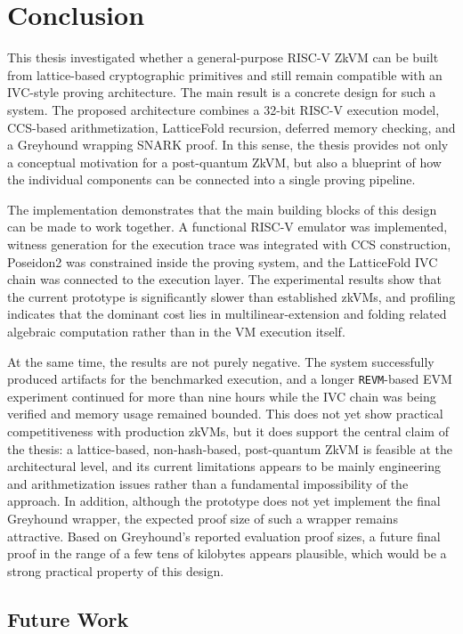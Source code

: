 \chapter{Conclusion}\label{chap:conclusion}

This thesis investigated whether a general-purpose RISC-V ZkVM can be built
from lattice-based cryptographic primitives and still remain compatible with an
IVC-style proving architecture. The main result is a concrete design for such a
system. The proposed architecture combines a 32-bit RISC-V execution model,
CCS-based arithmetization, LatticeFold recursion, deferred memory checking,
and a Greyhound wrapping SNARK proof. In this sense,
the thesis provides not only a conceptual motivation for a post-quantum ZkVM,
but also a blueprint of how the individual components can be
connected into a single proving pipeline.

The implementation demonstrates that the main building blocks of this design can
be made to work together. A functional RISC-V emulator was implemented, witness
generation for the execution trace was integrated with CCS construction,
Poseidon2 was constrained inside the proving system, and the LatticeFold
IVC chain was connected to the execution layer. The experimental results show
that the current prototype is significantly slower than established zkVMs, and
profiling indicates that the dominant cost lies in multilinear-extension and
folding related algebraic computation rather than in the VM execution itself.

At the same time, the results are not purely negative. The system successfully
produced artifacts for the benchmarked execution, and a
longer \texttt{REVM}-based EVM experiment continued for more than nine hours
while the IVC chain was being verified and memory usage remained bounded. This
does not yet show practical competitiveness with production zkVMs, but it does
support the central claim of the thesis: a lattice-based, non-hash-based,
post-quantum ZkVM is feasible at the architectural level, and its current
limitations appears to be mainly engineering and arithmetization issues rather
than a fundamental impossibility of the approach. In addition, although the
prototype does not yet implement the final Greyhound wrapper, the expected
proof size of such a wrapper remains attractive. Based on Greyhound's reported
evaluation proof sizes, a future final proof in the range of a few tens of
kilobytes appears plausible, which would be a strong practical property of this
design.

\section{Future Work}

